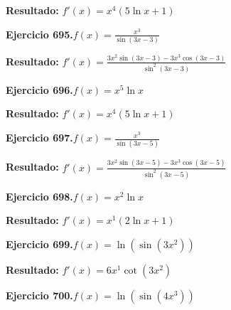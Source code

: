 \documentclass[10pt,a4paper]{article}
\begin{document}
\begin{solbox}
\textbf{Resultado:} \(\displaystyle f'(x) = x^{4}(5\ln x + 1)\)
\end{solbox}

\begin{ejbox}
\textbf{Ejercicio 695.}\quad $f(x) = \frac{x^{3}}{\sin(3x -3)}$
\end{ejbox}

\begin{solbox}
\textbf{Resultado:} \(\displaystyle f'(x) = \frac{3x^{2}\sin(3x -3) - 3x^{3}\cos(3x -3)}{\sin^2(3x -3)}\)
\end{solbox}

\begin{ejbox}
\textbf{Ejercicio 696.}\quad $f(x) = x^{5} \ln x$
\end{ejbox}

\begin{solbox}
\textbf{Resultado:} \(\displaystyle f'(x) = x^{4}(5\ln x + 1)\)
\end{solbox}

\newpage
\begin{ejbox}
\textbf{Ejercicio 697.}\quad $f(x) = \frac{x^{3}}{\sin(3x -5)}$
\end{ejbox}

\begin{solbox}
\textbf{Resultado:} \(\displaystyle f'(x) = \frac{3x^{2}\sin(3x -5) - 3x^{3}\cos(3x -5)}{\sin^2(3x -5)}\)
\end{solbox}

\begin{ejbox}
\textbf{Ejercicio 698.}\quad $f(x) = x^{2} \ln x$
\end{ejbox}

\begin{solbox}
\textbf{Resultado:} \(\displaystyle f'(x) = x^{1}(2\ln x + 1)\)
\end{solbox}

\begin{ejbox}
\textbf{Ejercicio 699.}\quad $f(x) = \ln(\sin(3x^{2}))$
\end{ejbox}

\begin{solbox}
\textbf{Resultado:} \(\displaystyle f'(x) = 6x^{1}\cot(3x^{2})\)
\end{solbox}

\newpage
\begin{ejbox}
\textbf{Ejercicio 700.}\quad $f(x) = \ln(\sin(4x^{3}))$
\end{ejbox}
\end{document}
